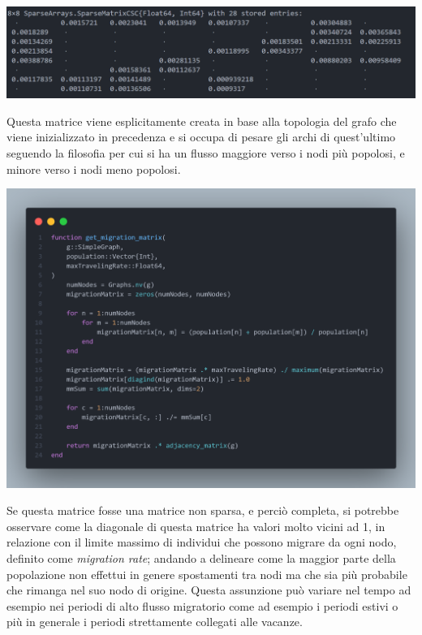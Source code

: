 \begin{minipage}{\linewidth}
	\centering
	\includegraphics[width=\textwidth]{img/migrationMatrix.png}
	\label{fig:migration matrix}
\end{minipage}

Questa matrice viene esplicitamente creata in base alla topologia del grafo che viene 
inizializzato in precedenza e si occupa di pesare gli archi di quest'ultimo seguendo la 
filosofia per cui si ha un flusso maggiore verso i nodi più popolosi, e minore verso i 
nodi meno popolosi. 

\begin{minipage}{\linewidth}
	\centering
	\includegraphics[width=\textwidth]{img/mmfunc.png}
	\label{fig:migration_matrix_function}
\end{minipage}

Se questa matrice fosse una matrice non sparsa, e perciò completa, si potrebbe osservare
come la diagonale di questa matrice ha valori molto vicini ad 1, in relazione con il limite
massimo di individui che possono migrare da ogni nodo, definito come \emph{migration rate}; 
andando a delineare come la maggior parte della popolazione non effettui in genere spostamenti 
tra nodi ma che sia più probabile che rimanga nel suo nodo di origine. Questa assunzione può 
variare nel tempo ad esempio nei periodi di alto flusso migratorio come ad esempio i periodi 
estivi o più in generale i periodi strettamente collegati alle vacanze.

